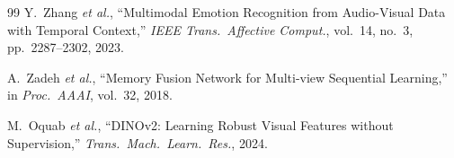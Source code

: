 \documentclass[10pt,conference]{IEEEtran}
\theoremstyle{ieeethm}
\theoremstyle{ieeedef}
\theoremstyle{ieeeremark}
\begin{document}
\begin{thebibliography}{99}
Y.~Zhang \textit{et al.},
``Multimodal Emotion Recognition from Audio-Visual Data with Temporal Context,''
\textit{IEEE Trans.\ Affective Comput.}, vol.~14, no.~3, pp.~2287--2302, 2023.

A.~Zadeh \textit{et al.},
``Memory Fusion Network for Multi-view Sequential Learning,''
in \textit{Proc.\ AAAI}, vol.~32, 2018.

M.~Oquab \textit{et al.},
``DINOv2: Learning Robust Visual Features without Supervision,''
\textit{Trans.\ Mach.\ Learn.\ Res.}, 2024.

\end{thebibliography}
\end{document}
